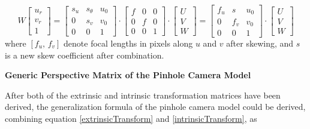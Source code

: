 \begin{equation}
%
W \left[ \begin{array}{c} u_r \\ v_r \\ 1 \end{array} \right] %
=  \begin{bmatrix} s_u & s_\theta & u_0 \\ 0 & s_v & v_0 \\ 0 & 0 & 1 \end{bmatrix} \cdot%
 \begin{bmatrix} f & 0 & 0 \\ 0 & f & 0 \\ 0 & 0 & 1 \end{bmatrix} \cdot %
\left[ \begin{array}{c} U \\ V \\ W \end{array} \right]%
=  \begin{bmatrix} f_u & s & u_0 \\ 0 & f_v & v_0 \\ 0 & 0 & 1 \end{bmatrix} \cdot%
\left[ \begin{array}{c} U \\ V \\ W \end{array} \right]%
%
\label{intrinsicTransform}
\end{equation}%
%
where \([f_u,\, f_v]\) denote focal lengths in pixels along \(u\) and \(v\) after skewing, and \(s\) is a new skew coefficient after combination.\\\par%
%
\textbf{Generic Perspective Matrix of the Pinhole Camera Model}\par%
After both of the extrinsic and intrinsic transformation matrices have been derived, the generalization formula of the pinhole camera model could be derived, combining equation \ref{extrinsicTransform} and \ref{intrinsicTransform}, as

